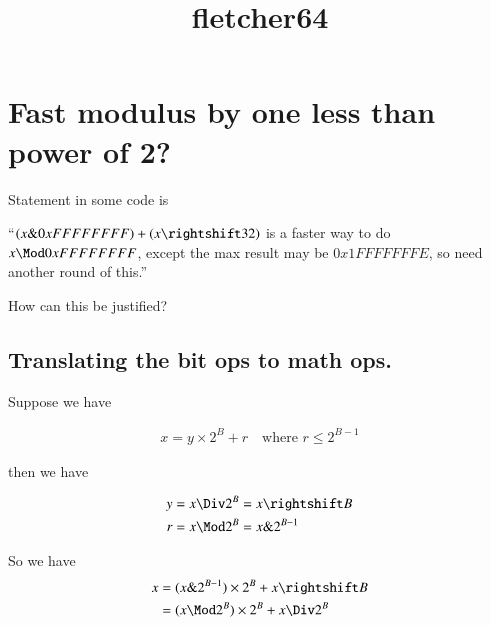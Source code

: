 
%
%




\title{fletcher64}

%

\section{Fast modulus by one less than power of 2? }

Statement in some code is

``$(x \& 0xFFFFFFFF) + (x \rightshift 32)$ is a faster way to do $x \Mod 0xFFFFFFFF$, except the max result may be
$0x1FFFFFFFE$, so need another round of this.''

How can this be justified?

\subsection{Translating the bit ops to math ops. }

Suppose we have 

\begin{align}\label{eqn:fletcher:modPower2}
x = y \times 2^B + r \quad \mbox{where $r \le 2^{B-1}$}
\end{align}

then we have

\begin{align*}
y &= x \Div 2^{B} = x \rightshift B \\
r &= x \Mod 2^B = x \& 2^{B-1}
\end{align*}

So we have
\begin{align*}
x 
&= (x \& 2^{B-1}) \times 2^B + x \rightshift B \\
&= (x \Mod 2^B) \times 2^B + x \Div 2^B \\
\end{align*}

